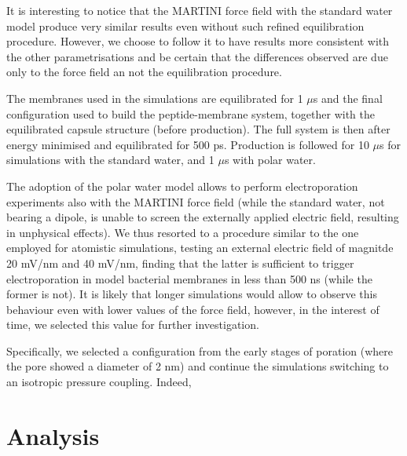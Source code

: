 It is interesting to notice that the MARTINI force field with the standard water model produce very similar results even without such refined equilibration procedure. However, we choose to follow it to have results more consistent with the other parametrisations and be certain that the differences observed are due only to the force field an not the equilibration procedure.

The membranes used in the simulations are equilibrated for 1 $\mu$s and the final configuration used to build the peptide-membrane system, together with the equilibrated capsule structure (before production). The full system is then after energy minimised and equilibrated for 500 ps.
%
Production is followed for 10 $\mu$s for simulations with the standard water, and 1 $\mu$s with polar water.

The adoption of the polar water model allows to perform electroporation experiments also with the MARTINI force field (while the standard water, not bearing a dipole, is unable to screen the externally applied electric field, resulting in unphysical effects).
%
We thus resorted to a procedure similar to the one employed for atomistic simulations, testing an external electric field of magnitde 20 mV/nm and 40 mV/nm, finding that the latter is sufficient to trigger electroporation in model bacterial membranes in less than 500 ns (while the former is not). It is likely that longer simulations would allow to observe this behaviour even with lower values of the force field, however, in the interest of time, we selected this value for further investigation.

Specifically, we selected a configuration from the early stages of poration (where the pore showed a diameter of 2 nm) and continue the simulations switching to an isotropic pressure coupling. Indeed, 




\section{Analysis}

